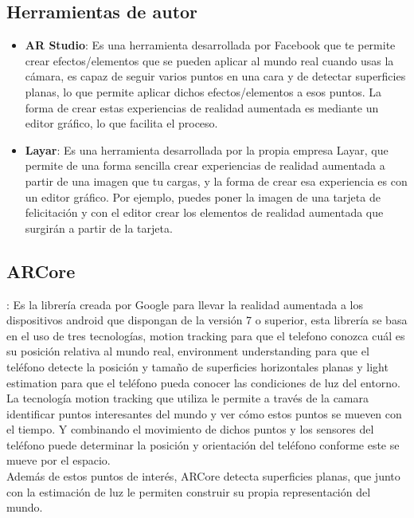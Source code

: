 \subsection{Herramientas de autor}
\begin{itemize}
  \item \textbf{AR Studio}: Es una herramienta desarrollada por Facebook que te permite crear efectos/elementos que se pueden aplicar al mundo real cuando usas la cámara, es capaz de seguir varios puntos en una cara y de detectar superficies planas, lo que permite aplicar dichos efectos/elementos a esos puntos. La forma de crear estas experiencias de realidad aumentada es mediante un editor gráfico, lo que facilita el proceso. \cite{ar-studio}

  \item  \textbf{Layar}: Es una herramienta desarrollada por la propia empresa Layar, que permite de una forma sencilla crear experiencias de realidad aumentada a partir de una imagen que tu cargas, y la forma de crear esa experiencia es con un editor gráfico. Por ejemplo, puedes poner la imagen de una tarjeta de felicitación y con el editor crear los elementos de realidad aumentada que surgirán a partir de la tarjeta. \cite{layar}
\end{itemize}

\subsection{ARCore}: Es la librería creada por Google para llevar la realidad aumentada a los dispositivos android que dispongan de la versión 7 o superior, esta librería se basa en el uso de tres tecnologías, motion tracking para que el telefono conozca cuál es su posición relativa al mundo real, environment understanding para que el teléfono detecte la posición y tamaño de superficies horizontales planas y light estimation para que el teléfono pueda conocer las condiciones de luz del entorno.\\

La tecnología motion tracking que utiliza le permite a través de la camara identificar puntos interesantes del mundo y ver cómo estos puntos se mueven con el tiempo. Y combinando el movimiento de dichos puntos y los sensores del teléfono puede determinar la posición y orientación del teléfono conforme este se mueve por el espacio.\\

Además de estos puntos de interés, ARCore detecta superficies planas, que junto con la estimación de luz le permiten construir su propia representación del mundo.\\


